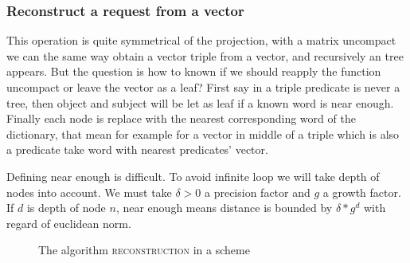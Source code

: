 \subsubsection{Reconstruct a request from a vector}

This operation is quite symmetrical of the projection, with a matrix uncompact we can the same way obtain a vector triple from a vector, and recursively an tree appears. But the question is how to known if we should reapply the function uncompact or leave the vector as a leaf? First say in a triple predicate is never a tree, then object and subject will be let as leaf if a known word is near enough. Finally each node is replace with the nearest corresponding word of the dictionary, that mean for example for a vector in middle of a triple which is also a predicate take word with nearest predicates' vector.

Defining near enough is difficult. To avoid infinite loop we will take depth of nodes into account. We must take $\delta>0$ a precision factor and $g$ a growth factor. If $d$ is depth of node $n$, near enough means distance is bounded by $\delta*g^d$ with regard of euclidean norm.  

\begin{figure}
\begin{center}
\caption{The algorithm \textsc{reconstruction} in a scheme}
\end{center}
\end{figure}

